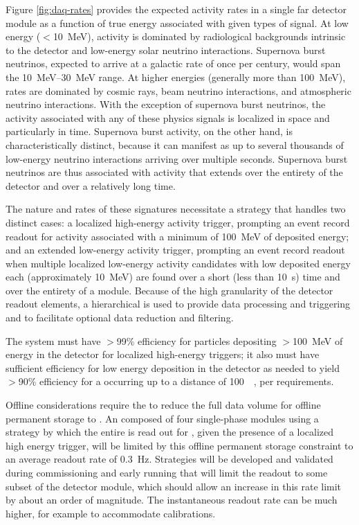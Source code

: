 Figure \ref{fig:daq-rates} provides the expected activity rates in a
single far detector module as a function of true energy associated
with given types of signal.
At low energy ($<$\SI{10}{\MeV}), activity is dominated by radiological backgrounds
intrinsic to the detector and
low-energy solar neutrino interactions. Supernova burst neutrinos,
expected to arrive at a galactic  rate of once per century, 
would span the \SIrange{10}{30}{\MeV} range. At higher energies (generally
more than \SI{100}{\MeV}), rates are dominated by cosmic rays, beam neutrino interactions,
and atmospheric neutrino interactions. With the exception of supernova
burst neutrinos, the activity associated with any of these physics
signals is localized in space and particularly in time. Supernova burst
activity, on the other hand, is characteristically distinct, because it can
manifest as up to several thousands of low-energy neutrino interactions
arriving over multiple seconds. Supernova burst neutrinos
are thus associated with activity that extends over the entirety of the
detector and over a relatively long time.

The nature and rates of these signatures necessitate a  strategy that handles two
distinct cases: a localized high-energy activity trigger, prompting an event record readout for
activity associated with a minimum of \SI{100}{\MeV} of deposited energy; and an extended low-energy
activity trigger, prompting an event record readout when multiple localized low-energy activity
candidates with low deposited energy each (approximately \SI{10}{\MeV}) are found over a short (less than
\SI{10}{\second}) time and over the entirety of a \nominalmodsize  module. Because of the high
granularity of the detector readout elements, a hierarchical  is used to
provide data processing and triggering and to facilitate optional data reduction and filtering. 

The   system must have $>$99\% efficiency for particles depositing $>$\SI{100}{\MeV}
of energy in the detector for localized high-energy triggers; it also must have
sufficient efficiency for low energy deposition in the detector as
needed to yield $>$90\% efficiency for a  occurring up to a
distance of \SI{100}{\kilo\parsec}, per  requirements.

Offline considerations require the  to reduce the
full  data volume for offline permanent storage to  \offsitepbpy.
An  composed of four single-phase modules using a
strategy by which the entire  is read out for \spreadout, 
given the presence of a localized high energy trigger, will be limited
by this offline permanent storage constraint to an average readout rate of \SI{0.3}{\hertz}. 
Strategies will be developed and validated during commissioning and early running that will limit the readout to some subset of the detector module, which should allow an increase in this rate limit by about an order of magnitude.
The instantaneous readout rate can be much higher, for example to accommodate calibrations.



